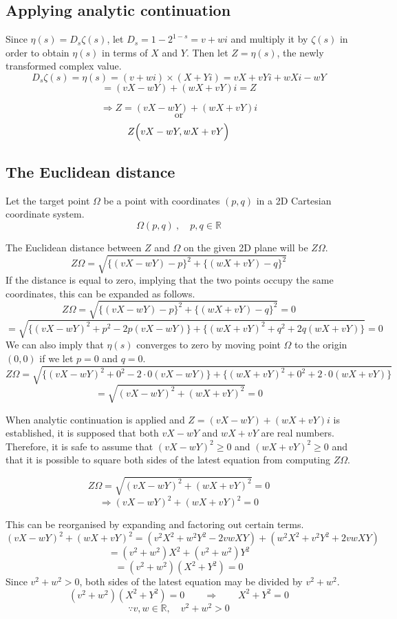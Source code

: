 \documentclass{amsart}
\begin{document}
	\subsection{Applying analytic continuation}
	Since $\eta(s) = D_s\zeta(s)$, let $D_s = 1-2^{1-s}=v+wi$ and multiply it by $\zeta(s)$ in order to obtain $\eta(s)$ in terms of $X$ and $Y$. Then let $Z = \eta(s)$, the newly transformed complex value.
	\[ D_s\zeta(s) = \eta(s) = (v+wi) \times (X+Yi) = vX + vYi + wXi - wY  \]
	\[ = (vX - wY) + (wX + vY)i = Z \]

	\[ \Rightarrow Z = (vX - wY) + (wX + vY)i \]
	\[ \text{or} \]
	\[ Z \Bigl( vX - wY, wX + vY \Bigr) \]
	
	\subsection{The Euclidean distance}
	Let the target point $\Omega$ be a point with coordinates $(p,q)$ in a 2D Cartesian coordinate system.
	\[ \Omega(p, q) \ , \quad p,q \in \mathbb{R} \]
	
	The Euclidean distance between $Z$ and $\Omega$ on the given 2D plane will be $Z\Omega$.
	\[ Z\Omega = \sqrt{\{(vX-wY)-p\}^2 + \{(wX+vY)-q\}^2} \]
	If the distance is equal to zero, implying that the two points occupy the same coordinates, this can be expanded as follows.
	\[ Z\Omega = \sqrt{\{(vX-wY)-p\}^2 + \{(wX+vY)-q\}^2} = 0 \]
	\[ = \sqrt{\{ (vX-wY)^2 {+} p^2 -2p(vX-wY) \} {+} \{ (wX{+}vY)^2 {+} q^2 {+} 2q(wX{+}vY) \}} = 0 \]
	We can also imply that $\eta(s)$ converges to zero by moving point $\Omega$ to the origin$(0,0)$ if we let $p=0$ and $q=0$.
	\[ Z\Omega = \sqrt{\{ (vX-wY)^2 {+} 0^2 -2 \cdot 0 (vX-wY) \} {+} \{ (wX{+}vY)^2 {+} 0^2 {+} 2 \cdot 0 (wX{+}vY) \}} \]
	\[ = \sqrt{(vX-wY)^2 {+} (wX{+}vY)^2} = 0 \]
	
	
	When analytic continuation is applied and $Z = (vX - wY) + (wX + vY)i$ is established, it is supposed that both $vX - wY$ and $wX + vY$ are real numbers. Therefore, it is safe to assume that $(vX-wY)^2 \geq 0$ and $(wX+vY)^2 \geq 0$ and that it is possible to square both sides of the latest equation from computing $Z\Omega$.
	
	
	\[ Z\Omega =  \sqrt{(vX-wY)^2 + (wX+vY)^2} = 0 \]
	\[ \Rightarrow (vX-wY)^2 + (wX+vY)^2 = 0 \]
	
	This can be reorganised by expanding and factoring out certain terms.
	\[ (vX-wY)^2 + (wX+vY)^2 = (v^2X^2 + w^2Y^2 - 2vwXY) + (w^2X^2 + v^2Y^2 + 2vwXY) \]
	\[ = (v^2 + w^2)X^2 + (v^2 + w^2)Y^2 \]
	\[ = (v^2 + w^2)(X^2+Y^2) = 0 \]
	Since $v^2 + w^2 >0$, both sides of the latest equation may be divided by $v^2 + w^2$.
	\[ (v^2 + w^2)(X^2+Y^2) = 0 \qquad \Rightarrow \qquad X^2+Y^2 = 0 \]
	\[ \because v, w \in \mathbb{R}, \quad v^2 + w^2 > 0 \]
	\[  \]
	
\end{document}
